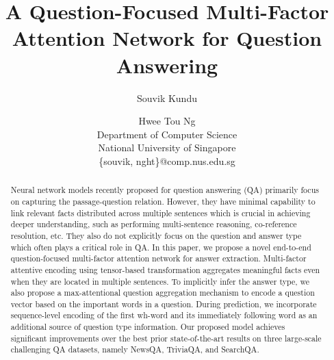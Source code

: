 \documentclass[letterpaper]{article} %
\begin{document}
%

\title{A Question-Focused Multi-Factor Attention Network for Question Answering}

\author{Souvik Kundu \and Hwee Tou Ng\\
Department of Computer Science\\
National University of Singapore\\
\{souvik, nght\}@comp.nus.edu.sg\\
}

\maketitle
\begin{abstract}

Neural network models recently proposed for question answering (QA) primarily focus on capturing the passage-question relation. However, they have minimal capability to link relevant facts distributed across multiple sentences which is crucial in achieving deeper understanding, such as performing multi-sentence reasoning, co-reference resolution, etc. They also do not explicitly focus on the question and answer type which often plays a critical role in QA. In this paper, we propose a novel end-to-end question-focused multi-factor attention network for answer extraction. Multi-factor attentive encoding using tensor-based transformation aggregates meaningful facts even when they are located in multiple sentences. To implicitly infer the answer type, we also propose a max-attentional question aggregation mechanism to encode a question vector based on the important words in a question. During prediction, we incorporate sequence-level encoding of the first wh-word and its immediately following word as an additional source of question type information. Our proposed model achieves significant improvements over the best prior state-of-the-art results on three large-scale challenging QA datasets, namely NewsQA, TriviaQA, and SearchQA.

\end{abstract}
\end{document}
